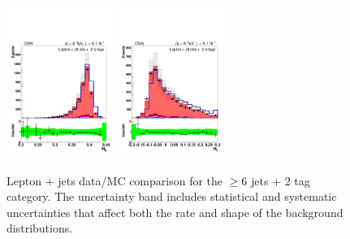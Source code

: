 \begin{figure}[hbtp]
\begin{center}
   \includegraphics[width=0.31\textwidth]{Figures/Analysis_1_Diagrams/d2MCPlots_h0_cut3_jge6_t2_Combined_HtWgt.pdf}
   \includegraphics[width=0.31\textwidth]{Figures/Analysis_1_Diagrams/d2MCPlots_h1_cut3_jge6_t2_Combined_HtWgt.pdf}
   \hspace{0.055\textwidth}
   \caption{Lepton + jets data/MC comparison for the $\ge$6 jets + 2 tag category.  The uncertainty band includes statistical and systematic uncertainties that affect both the rate and shape of the background distributions.}
   \label{fig:lj_input_6j_2t_part1}
   \hspace{0.055\textwidth}
 \end{center}
\end{figure}

\clearpage

